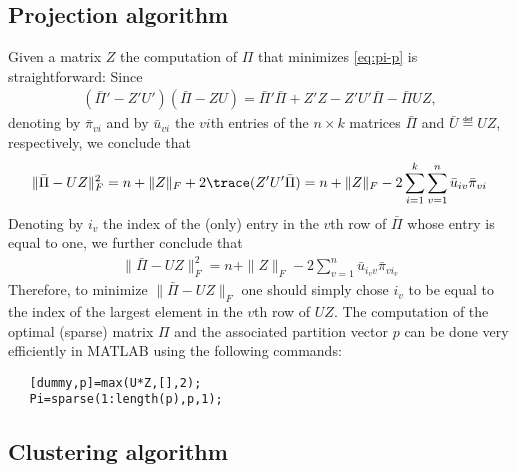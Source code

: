 \documentclass[10pt]{article}
\begin{document}
\subsection{Projection algorithm}

Given a matrix $Z$ the computation of $\Pi$ that minimizes
\eqref{eq:pi-p} is straightforward: Since
\begin{align*}
  (\bar \Pi'-Z' U')(\bar \Pi-Z U)= \bar \Pi'\bar \Pi+ Z' Z- Z' U' \bar \Pi-\bar\Pi U Z,
\end{align*}
denoting by $\bar \pi_{v i}$ and by $\bar u_{v i}$ the $v i$th entries of the $n\times
k$ matrices $\bar\Pi$ and $\bar U\eqdef U Z$, respectively, we conclude that
\begin{align*}
  \|\bar \Pi-U Z\|_F^2=n+\|Z\|_F+2\trace(Z' U' \bar \Pi)
  =n+\|Z\|_F-2\sum_{i=1}^k \sum_{v=1}^n \bar u_{i v} \bar\pi_{v i}
\end{align*}
Denoting by $i_v$ the index of the (only) entry in the $v$th row of
$\bar\Pi$ whose entry is equal to one, we further conclude that
\begin{align*}
  \|\bar \Pi-U Z\|_F^2=n+\|Z\|_F-2\sum_{v=1}^n \bar u_{i_v v} \bar\pi_{v i_v}
\end{align*}
Therefore, to minimize $\|\bar \Pi-U Z\|_F$ one should simply chose $i_v$
to be equal to the index of the largest element in the $v$th row of $U
Z$. The computation of the optimal (sparse) matrix $\Pi$ and the
associated partition vector $p$ can be done very efficiently in MATLAB
using the following commands:
\begin{verbatim}
   [dummy,p]=max(U*Z,[],2);
   Pi=sparse(1:length(p),p,1);
\end{verbatim}

\subsection{Clustering algorithm}
\end{document}
